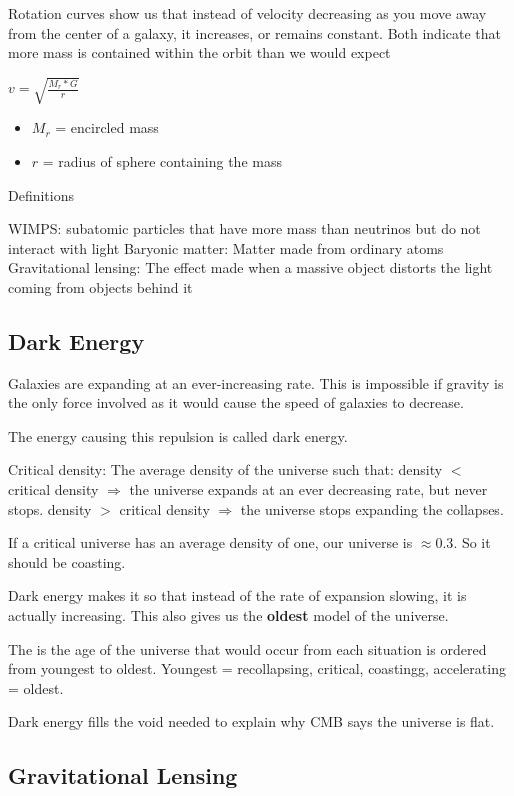 Rotation curves show us that instead of velocity decreasing as you move away from the center of a galaxy, it increases, or remains constant.  Both indicate that more mass is contained within the orbit than we would expect

\item $v = \sqrt{\frac{M_r * G}{r}}$
\begin{itemize}
    \item $M_r$ = encircled mass
    \item $r$ = radius of sphere containing the mass
\end{itemize}

Definitions

WIMPS: subatomic particles that have more mass than neutrinos but do not interact with light
Baryonic matter: Matter made from ordinary atoms
Gravitational lensing: The effect made when a massive object distorts the light coming from objects behind it

\subsection{Dark Energy}

Galaxies are expanding at an ever-increasing rate.  This is impossible if gravity is the only force involved as it would cause the speed of galaxies to decrease.

The energy causing this repulsion is called dark energy.

Critical density: The average density of the universe such that:
density $<$ critical density $\Rightarrow$ the universe expands at an ever decreasing rate, but never stops.
density $>$ critical density $\Rightarrow$ the universe stops expanding the collapses.

If a critical universe has an average density of one, our universe is $\approx 0.3$.  So it should be coasting.

Dark energy makes it so that instead of the rate of expansion slowing, it is actually increasing.  This also gives us the \textbf{oldest} model of the universe.

The is the age of the universe that would occur from each situation is ordered from youngest to oldest.  Youngest = recollapsing, critical, coastingg, accelerating = oldest.

Dark energy fills the void needed to explain why CMB says the universe is flat.

\subsection{Gravitational Lensing}

